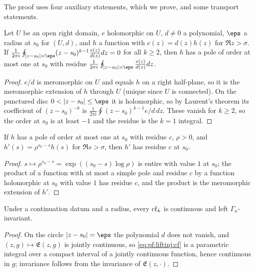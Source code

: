 The proof uses four auxiliary statements, which we prove, and some transport statements.

\begin{lemma}\label{pf:liftinj:K2}
Let $U$ be an open right domain, $e$ holomorphic on $U$, $d\ne0$ a polynomial, $\eps$ a radius at $s_0$ for $(U,d)$,
and $h$ a function with $e(z)=d(z)h(z)$ for $\Re z>\sigma$. If
$\frac1{2\pi i}\oint_{|z-s_0|=\eps}(z-s_0)^{k-1}\frac{e(z)}{d(z)}dz=0$ for all $k\ge2$, then $h$ has a pole of order at most one at
$s_0$ with residue $\frac1{2\pi i}\oint_{|z-s_0|=\eps}\frac{e(z)}{d(z)}dz$.
\end{lemma}

\begin{proof}
$e/d$ is meromorphic on $U$ and equals $h$ on a right half-plane, so it is the meromorphic extension of $h$ through $U$
(unique since $U$ is connected). On the punctured disc $0<|z-s_0|\le\eps$ it is holomorphic, so by Laurent's theorem its
coefficient of $(z-s_0)^{-k}$ is $\frac1{2\pi i}\oint(z-s_0)^{k-1}e/d\,dz$. These vanish for $k\ge2$, so the order at $s_0$ is
at least $-1$ and the residue is the $k=1$ integral.
\end{proof}

\begin{lemma}\label{pf:liftinj:K2b}
If $h$ has a pole of order at most one at $s_0$ with residue $c$, $\rho>0$, and $h'(s)=\rho^{s_0-s}h(s)$ for $\Re s>\sigma$, then
$h'$ has residue $c$ at $s_0$.
\end{lemma}

\begin{proof}
$s\mapsto\rho^{s_0-s}=\exp((s_0-s)\log\rho)$ is entire with value $1$ at $s_0$; the product of a function with at most a
simple pole and residue $c$ by a function holomorphic at $s_0$ with value $1$ has residue $c$, and the product is the
meromorphic extension of $h'$.
\end{proof}

\begin{lemma}\label{pf:liftinj:K2c}
Under a continuation datum and a radius, every $\operatorname{cf}_k$ is continuous and left $\Gamma_n$-invariant.
\end{lemma}

\begin{proof}
On the circle $|z-s_0|=\eps$ the polynomial $d$ does not vanish, and $(z,g)\mapsto\mathfrak E(z,g)$ is jointly continuous, so
\eqref{eq:pf:liftinj:cf} is a parametric integral over a compact interval of a jointly continuous function, hence
continuous in $g$; invariance follows from the invariance of $\mathfrak E(z,\cdot)$.
\end{proof}

